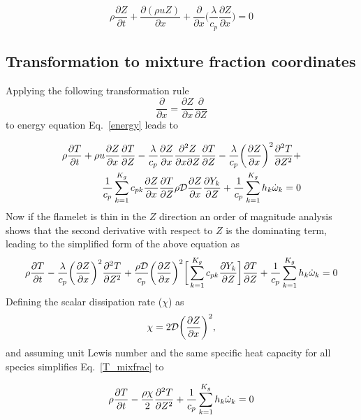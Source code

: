 \begin{equation}
 \rho \frac{\partial Z}{\partial t} + 
\frac{\partial (\rho u Z)}{\partial x} + \frac{\partial }{\partial x}\bigg(\frac{\lambda}{c_p} \frac{\partial Z}{\partial x} \bigg) =0
\end{equation}

\subsection{Transformation to mixture fraction coordinates}
Applying the following transformation rule
\begin{equation}
 \frac{\partial}{\partial x}= \frac{\partial Z}{\partial x} \frac{\partial }{\partial Z}
\end{equation}
to energy equation Eq.~\ref{energy} leads to


\begin{equation}
\begin{split}
 \rho \frac{\partial T}{\partial t } + \rho u \frac{\partial Z}{\partial x }\frac{\partial T}{\partial Z } - \frac{\lambda}{c_p}\frac{\partial Z}{\partial x }\frac{\partial {^2Z}}{\partial {x\partial Z} } \frac{\partial T}{\partial Z } -
\frac{\lambda}{c_p}\bigg( \frac{\partial Z}{\partial x }\bigg)^2 \frac{\partial {^2T}}{\partial {Z^2} } + \\
\frac{1}{c_p}\sum_{k=1}^{K_g} c_{pk	} \frac{\partial Z}{\partial x }\frac{\partial T}{\partial Z }\rho\mathcal{D}\frac{\partial Z}{\partial x }\frac{\partial {Y_k}}{\partial Z } + 
\frac{1}{c_p} \sum_{k=1}^{K_g} h_k\dot{\omega}_k = 0
\end{split}
\end{equation}
Now if the flamelet is thin in the $Z$ direction an order of magnitude analysis shows that the second derivative with respect to $Z$ is the dominating term, leading to the simplified form of the above equation as
\begin{equation}
 \rho \frac{\partial T}{\partial t } -\frac{\lambda}{c_p}\bigg( \frac{\partial Z}{\partial x } \bigg)^2 \frac{\partial {^2T}}{\partial {Z^2} }
+ \frac{\rho \mathcal{D}}{c_p} \bigg(\frac{\partial Z}{\partial x }\bigg)^2 \bigg[\sum_{k=1}^{K_g}c_{pk}\frac{\partial {Y_k}}{\partial Z }\bigg] \frac{\partial T}{\partial Z } + \frac{1}{c_p}\sum_{k=1}^{K_g} h_k\dot{\omega}_k = 0
\label{T_mixfrac}
\end{equation}
Defining the scalar dissipation rate ($\chi$) as
\begin{equation}
 \chi = 2\mathcal{D} \bigg( \frac{\partial Z}{\partial x } \bigg)^2,
\end{equation}
and assuming unit Lewis number and the same specific heat capacity for all species simplifies Eq.~\ref{T_mixfrac} to

\begin{equation}
 \rho \frac{\partial T}{\partial t } - \frac{\rho \chi}{2}\frac{\partial {^2T}}{\partial {Z^2} } + \frac{1}{c_p} \sum_{k=1}^{K_g} h_k\dot{\omega}_k =0
\end{equation}

